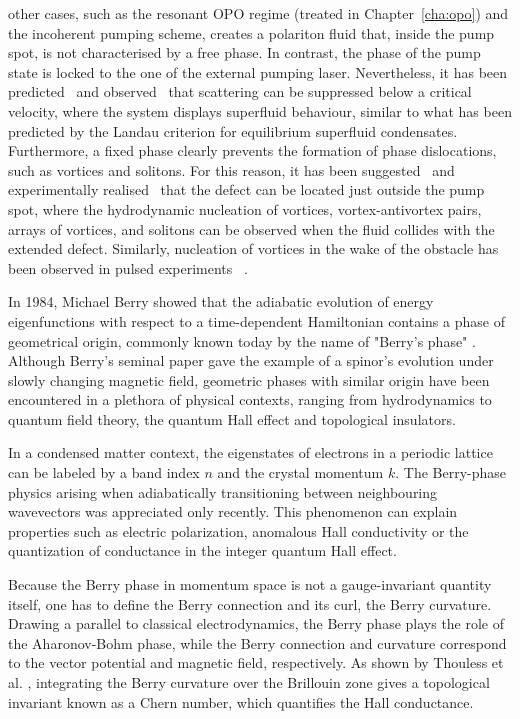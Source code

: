 other cases, such as the resonant OPO regime (treated in
Chapter~\ref{cha:opo}) and the incoherent pumping scheme, creates a
polariton fluid that, inside the pump spot, is not characterised by a
free phase. In contrast, the phase of the pump state is locked to the
one of the external pumping laser. Nevertheless, it has been
predicted~\cite{Carusotto_2004,Ciuti_2005} and
observed~\cite{Amo_2009} that scattering can be suppressed below a
critical velocity, where the system displays superfluid behaviour,
similar to what has been predicted by the Landau criterion for
equilibrium superfluid condensates. Furthermore, a fixed phase clearly
prevents the formation of phase dislocations, such as vortices and
solitons. For this reason, it has been suggested~\cite{Pigeon_2011}
and experimentally realised~\cite{Amo_2011} that the defect can be
located just outside the pump spot, where the hydrodynamic nucleation
of vortices, vortex-antivortex pairs, arrays of vortices, and solitons
can be observed when the fluid collides with the extended
defect. Similarly, nucleation of vortices in the wake of the obstacle
has been observed in pulsed experiments
~\cite{Nardin_2011,Sanvitto_2011}.
%

In 1984, Michael Berry showed that the adiabatic evolution of energy
eigenfunctions with respect to a time-dependent Hamiltonian contains a
phase of geometrical origin, commonly known today by the name of
"Berry's phase" \cite{Berry1984}.  Although Berry's seminal paper gave
the example of a spinor's evolution under slowly changing magnetic
field, geometric phases \cite{shapere1989geometric} with similar
origin have been encountered in a plethora of physical contexts,
ranging from hydrodynamics to quantum field theory, the quantum Hall
effect and topological insulators.

In a condensed matter context, the eigenstates of electrons in a
periodic lattice can be labeled by a band index $n$ and the crystal
momentum $k$. The Berry-phase physics arising when adiabatically
transitioning between neighbouring wavevectors was appreciated only
recently. This phenomenon can explain properties such as electric
polarization, anomalous Hall conductivity or the quantization of
conductance in the integer quantum Hall effect.

Because the Berry phase in momentum space is not a gauge-invariant
quantity itself, one has to define the Berry connection and its curl,
the Berry curvature.  Drawing a parallel to classical electrodynamics,
the Berry phase plays the role of the Aharonov-Bohm phase, while the
Berry connection and curvature correspond to the vector potential and
magnetic field, respectively.  As shown by Thouless et
al. \cite{Thouless1982}, integrating the Berry curvature over the
Brillouin zone gives a topological invariant known as a Chern number,
which quantifies the Hall conductance.

